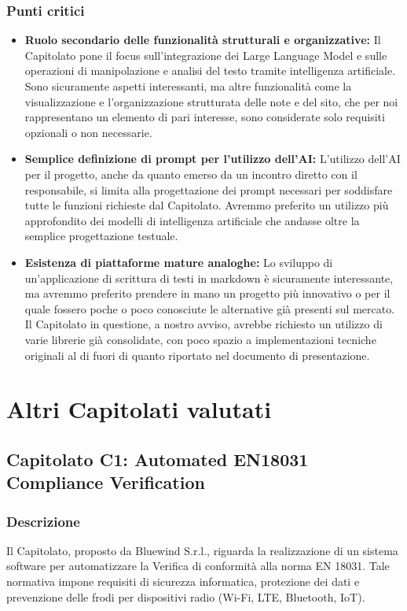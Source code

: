 \documentclass[a4paper,12pt]{article}
\begin{document}
\subsubsection{Punti critici}
\begin{itemize}
    \item \textbf{Ruolo secondario delle funzionalità strutturali e organizzative:} Il Capitolato pone il focus sull’integrazione dei Large Language Model e sulle operazioni di manipolazione e analisi del testo tramite intelligenza artificiale. Sono sicuramente aspetti interessanti, ma altre funzionalità come la visualizzazione e l’organizzazione strutturata delle note e del sito, che per noi rappresentano un elemento di pari interesse, sono considerate solo requisiti opzionali o non necessarie.
    \item \textbf{Semplice definizione di prompt per l’utilizzo dell’AI:} L’utilizzo dell’AI per il progetto, anche da quanto emerso da un incontro diretto con il responsabile, si limita alla progettazione dei prompt necessari per soddisfare tutte le funzioni richieste dal Capitolato. Avremmo preferito un utilizzo più approfondito dei modelli di intelligenza artificiale che andasse oltre la semplice progettazione testuale.
    \item \textbf{Esistenza di piattaforme mature analoghe:} Lo sviluppo di un’applicazione di scrittura di testi in markdown è sicuramente interessante, ma avremmo preferito prendere in mano un progetto più innovativo o per il quale fossero poche o poco conosciute le alternative già presenti sul mercato. Il Capitolato in questione, a nostro avviso, avrebbe richiesto un utilizzo di varie librerie già consolidate, con poco spazio a implementazioni tecniche originali al di fuori di quanto riportato nel documento di presentazione.
\end{itemize}


\section{Altri Capitolati valutati}
\subsection{Capitolato C1: Automated EN18031 Compliance Verification}

\subsubsection{Descrizione}
Il Capitolato, proposto da Bluewind S.r.l., riguarda la realizzazione di un sistema software per automatizzare la Verifica di conformità alla norma EN 18031. Tale normativa impone requisiti di sicurezza informatica, protezione dei dati e prevenzione delle frodi per dispositivi radio (Wi-Fi, LTE, Bluetooth, IoT).
\end{document}
